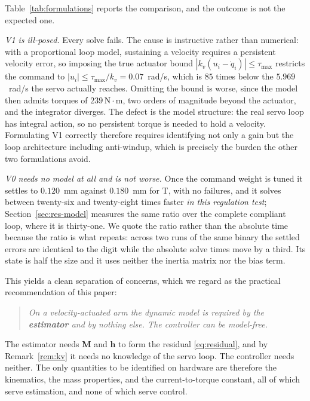\documentclass{ieeeaccess}
\begin{document}
Table~\ref{tab:formulations} reports the comparison, and the outcome is not the
expected one.

\emph{V1 is ill-posed.} Every solve fails. The cause is instructive rather than
numerical: with a proportional loop model, sustaining a velocity requires a
persistent velocity error, so imposing the true actuator bound
$|k_v(u_i-\dot q_i)|\le\tau_{\max}$ restricts the command to
$|u_i|\le\tau_{\max}/k_v=0.07$~rad/s, which is $85$ times below the
$5.969$~rad/s the servo actually reaches. Omitting the bound is worse, since the
model then admits torques of $239\,\mathrm{N}\cdot\mathrm{m}$, two orders of
magnitude beyond the actuator, and the integrator diverges. The defect is the
model structure: the real servo loop has integral action, so no persistent torque
is needed to hold a velocity. Formulating V1 correctly therefore requires
identifying not only a gain but the loop architecture including anti-windup, which
is precisely the burden the other two formulations avoid.

\emph{V0 needs no model at all and is not worse.} Once the command weight is
tuned it settles to $0.120$~mm against $0.180$~mm for T, with no failures, and it
solves between twenty-six and twenty-eight times faster \emph{in this regulation
test}; Section~\ref{sec:res-model} measures the same ratio over the complete
compliant loop, where it is thirty-one. We quote the ratio
rather than the absolute time because the ratio is what repeats: across two runs of
the same binary the settled errors are identical to the digit while the absolute
solve times move by a third. Its state is half the size and it uses neither the
inertia matrix nor the bias term.

This yields a clean separation of concerns, which we regard as the practical
recommendation of this paper:

\begin{quote}
\emph{On a velocity-actuated arm the dynamic model is required by the
\textbf{estimator} and by nothing else. The controller can be model-free.}
\end{quote}

The estimator needs $\bm M$ and $\bm h$ to form the residual \eqref{eq:residual},
and by Remark~\ref{rem:kv} it needs no knowledge of the servo loop. The controller
needs neither. The only quantities to be identified on hardware are therefore the
kinematics, the mass properties, and the current-to-torque constant, all of which
serve estimation, and none of which serve control.
\end{document}
